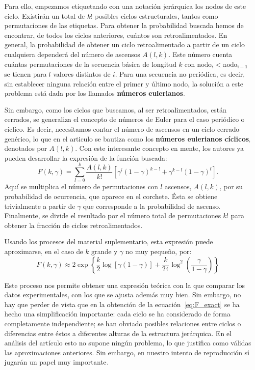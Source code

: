 \documentclass[1p]{elsarticle}
\begin{document}
    Para ello, empezamos etiquetando con una notación jerárquica los nodos de este ciclo. 
    Existirán un total de $k!$ posibles ciclos estructurales, tantos como permutaciones de las etiquetas. 
    Para obtener la probabilidad buscada hemos de encontrar, de todos los ciclos anteriores, cuántos son retroalimentados.
    En general, la probabilidad de obtener un ciclo retroalimentado a partir de un ciclo cualquiera dependerá del número de ascensos $A(l,k)$.
    Este número cuenta cuántas permutaciones de la secuencia básica de longitud $k$ con $\textrm{nodo}_{i} < \textrm{nodo}_{i+1}$ se tienen para $l$ valores distintos de $i$. Para una secuencia no periódica, es decir, sin establecer ninguna relación entre el primer y último nodo, la solución a este problema está dada por los llamados \textbf{números eulerianos}.

    Sin embargo, como los ciclos que buscamos, al ser retroalimentados, están cerrados, se  generaliza el concepto de números de Euler para el caso periódico o cíclico.
    Es decir, necesitamos contar el número de ascensos en un ciclo cerrado genérico, lo que en el articulo se bautiza como los \textbf{números eulerianos cíclicos}, denotados por $A(l,k)$.
Con este interesante concepto en mente, los autores ya pueden desarrollar la expresión de la función buscada: %
    \begin{equation}
    \label{eq:F_exact}
        F(k,\gamma)=\sum_{l=0}^{k}\frac{A(l,k)}{k!}[\gamma^l(1-\gamma)^{k-l}+\gamma^{k-l}(1-\gamma)^l]
    .
    \end{equation}
Aquí se multiplica el número de permutaciones con $l$ ascensos, $A(l,k)$, por su probabilidad de ocurrencia, que aparece en el corchete.
Ésta se obtiene trivialmente a partir de $\gamma$ que corresponde a la probabilidad de ascenso. Finalmente, se divide el resultado por el número total de permutaciones $k!$ para obtener la fracción de ciclos retroalimentados.

Usando los procesos del material suplementario, esta expresión puede aproximarse, en el caso de $k$ grande y $\gamma$ no muy pequeño, por:
\begin{equation}
    \label{eq:F_asymp}
    F(k,\gamma)
    \approx 
    2\exp\left\{\frac{k}{2}\log[\gamma(1-\gamma)]+\frac{k}{24} \log^2(\frac{\gamma}{1-\gamma})\right\}
\end{equation}

    Este proceso nos permite obtener una expresión teórica con la que comparar los datos experimentales, con los que se ajusta además muy bien.
    Sin embargo, no hay que perder de vista que en la obtención de la ecuación~\ref{eq:F_exact} se ha hecho una simplificación importante: cada ciclo se ha considerado de forma completamente independiente;
    se han obviado posibles relaciones entre ciclos o diferencias entre éstos a diferentes alturas de la estructura jerárquica.
    En el análisis del artículo esto no supone ningún problema, lo que justifica como válidas las aproximaciones anteriores.
    Sin embargo, en nuestro intento de reproducción sí jugarán un papel muy importante.
\end{document}
